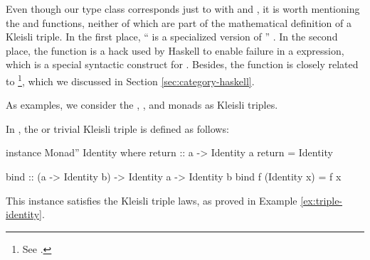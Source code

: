\begin{remark}
  Even though our  type class corresponds just to
   with  and
  \texthaskell{(>>=)}, it is worth mentioning the \texthaskell{(>>)}
  and  functions, neither of which are part of the
  mathematical definition of a Kleisli triple. In the first place,
  ``\texthaskell{(>>)} is a specialized version of
  \texthaskell{(>>=)}'' \parencite[30]{yorgey-2009}. In the second
  place, the  function is a hack used by Haskell to
  enable failure in a  expression, which is a special
  syntactic construct for 
  \parencites[273]{lipovaca-2011}[88]{peytonjones-2003}[30]{yorgey-2009}.
  Besides, the  function is closely related to
  \footnote{See \parencite[§
      3.1]{peytonjones-2003}.}, which we discussed in Section
  \ref{sec:category-haskell}.

\end{remark}

As examples, we consider the ,
, and \texthaskell{[]} monads as Kleisli triples.

\begin{example}
  \label{ex:triple-identity-haskell}

  In \hask, the  or trivial Kleisli triple is
  defined as follows:
  \begin{codehaskell}
instance Monad'' Identity where
  return :: a -> Identity a
  return = Identity

  bind :: (a -> Identity b) -> Identity a -> Identity b
  bind f (Identity x) = f x
  \end{codehaskell}
  This instance satisfies the Kleisli triple laws, as proved in
  Example \ref{ex:triple-identity}.

\end{example}

